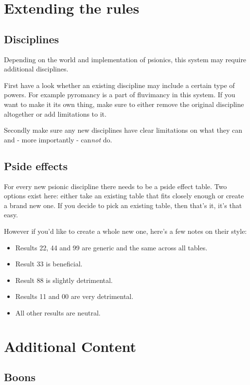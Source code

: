 \documentclass[12pt,a4paper,openany]{book}
\begin{document}
	\chapter{Extending the rules}
	\section{Disciplines}
	Depending on the world and implementation of psionics, this system may require additional disciplines.\par
	First have a look whether an existing discipline may include a certain type of powers. For example pyromancy is a part of fluvimancy in this system. If you want to make it its own thing, make sure to either remove the original discipline altogether or add limitations to it.\par
	Secondly make sure any new disciplines have clear limitations on what they can and - more importantly - can\emph{not} do.
	\pagebreak %
	\section{Pside effects}
	For every new psionic discipline there needs to be a pside effect table. Two options exist here: either take an existing table that fits closely enough or create a brand new one. If you decide to pick an existing table, then that's it, it's that easy.\par
	However if you'd like to create a whole new one, here's a few notes on their style:
	\begin{itemize}
		\item Results 22, 44 and 99 are generic and the same across all tables.
		\item Result 33 is beneficial.
		\item Result 88 is slightly detrimental.
		\item Results 11 and 00 are very detrimental.
		\item All other results are neutral.
	\end{itemize}

	\chapter{Additional Content}
	\label{ch:addcontent}
	\section{Boons}
\end{document}
